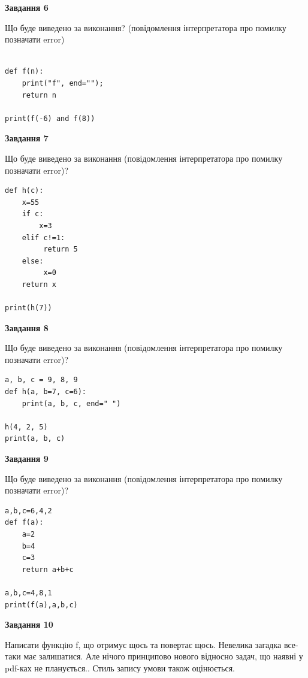 \documentclass[12pt, ukrainian]{article}
\begin{document}
{\begin {large}
{\begin {center}\textbf{Завдання 6}\end {center}}

Що буде виведено за виконання? (повідомлення інтерпретатора про помилку позначати error)\par
\begin{verbatim}

def f(n):
    print("f", end="");
    return n

print(f(-6) and f(8))
\end{verbatim}

{\begin {center}\textbf{Завдання 7}\end {center}}

Що буде виведено за виконання (повідомлення інтерпретатора про помилку позначати error)?\par
\begin{verbatim}
def h(c):
    x=55
    if c: 
        x=3
    elif c!=1:
         return 5
    else:
         x=0
    return x

print(h(7))
\end{verbatim}

{\begin {center}\textbf{Завдання 8}\end {center}}

Що буде виведено за виконання (повідомлення інтерпретатора про помилку позначати error)?\par
\begin{verbatim}
a, b, c = 9, 8, 9
def h(a, b=7, c=6):
    print(a, b, c, end=" ")

h(4, 2, 5)
print(a, b, c)
\end{verbatim}

{\begin {center}\textbf{Завдання 9}\end {center}}

Що буде виведено за виконання (повідомлення інтерпретатора про помилку позначати error)?\par
\begin{verbatim}
a,b,c=6,4,2
def f(a):
    a=2
    b=4
    c=3
    return a+b+c

a,b,c=4,8,1
print(f(a),a,b,c)
\end{verbatim}

{\begin {center}\textbf{Завдання 10}\end {center}}


Написати функцiю f, що отримує щось та повертає щось. Невелика загадка все-таки має залишатися. Але нічого принципово нового відносно задач, що наявні у pdf-ках не планується.. Стиль запису умови також оцінюється.\par
\end {large}}
\newpage
\end{document}
